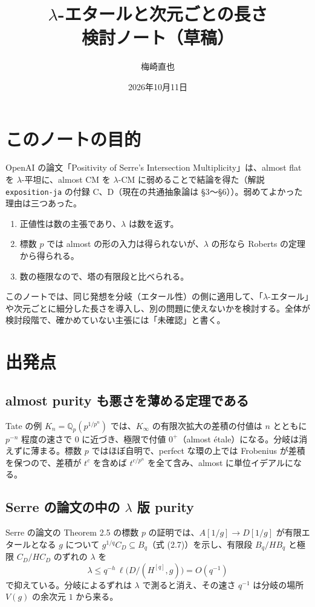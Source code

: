 \documentclass[11pt,a4paper]{ltjsarticle}
\title{$\lambda$-エタールと次元ごとの長さ\\[2pt]\large 検討ノート（草稿）}
\author{梅崎直也}
\date{2026年10月11日}
\theoremstyle{plain}
\theoremstyle{definition}
\theoremstyle{remark}
\theoremstyle{plain}
\begin{document}
\maketitle

\section*{このノートの目的}

OpenAI の論文「Positivity of Serre's Intersection Multiplicity」は、almost flat を $\lambda$-平坦に、almost CM を $\lambda$-CM に弱めることで結論を得た（解説 \texttt{exposition-ja} の付録 C、D（現在の共通抽象論は §3〜§6））。弱めてよかった理由は三つあった。
\begin{enumerate}
  \item 正値性は数の主張であり、$\lambda$ は数を返す。
  \item 標数 $p$ では almost の形の入力は得られないが、$\lambda$ の形なら Roberts の定理から得られる。
  \item 数の極限なので、塔の有限段と比べられる。
\end{enumerate}
このノートでは、同じ発想を分岐（エタール性）の側に適用して、「$\lambda$-エタール」や次元ごとに細分した長さを導入し、別の問題に使えないかを検討する。全体が検討段階で、確かめていない主張には「未確認」と書く。

\section{出発点}

\subsection{almost purity も悪さを薄める定理である}
Tate の例 $K_n = \mathbb{Q}_p(p^{1/p^n})$ では、$K_\infty$ の有限次拡大の差積の付値は $n$ とともに $p^{-n}$ 程度の速さで $0$ に近づき、極限で付値 $0^+$（almost étale）になる。分岐は消えずに薄まる。標数 $p$ ではほぼ自明で、perfect な環の上では Frobenius が差積を保つので、差積が $t^c$ を含めば $t^{c/p^n}$ を全て含み、almost に単位イデアルになる。

\subsection{Serre の論文の中の $\lambda$ 版 purity}
Serre の論文の Theorem 2.5 の標数 $p$ の証明では、$A[1/g]\to D[1/g]$ が有限エタールとなる $g$ について $g^{1/q}C_D\subseteq B_q$（式 (2.7)）を示し、有限段 $B_q/HB_q$ と極限 $C_D/HC_D$ のずれの $\lambda$ を
\[
  \lambda\le q^{-h}\,\ell\bigl(D/(H^{[q]},g)\bigr) = O(q^{-1})
\]
で抑えている。分岐によるずれは $\lambda$ で測ると消え、その速さ $q^{-1}$ は分岐の場所 $V(g)$ の余次元 $1$ から来る。
\end{document}
